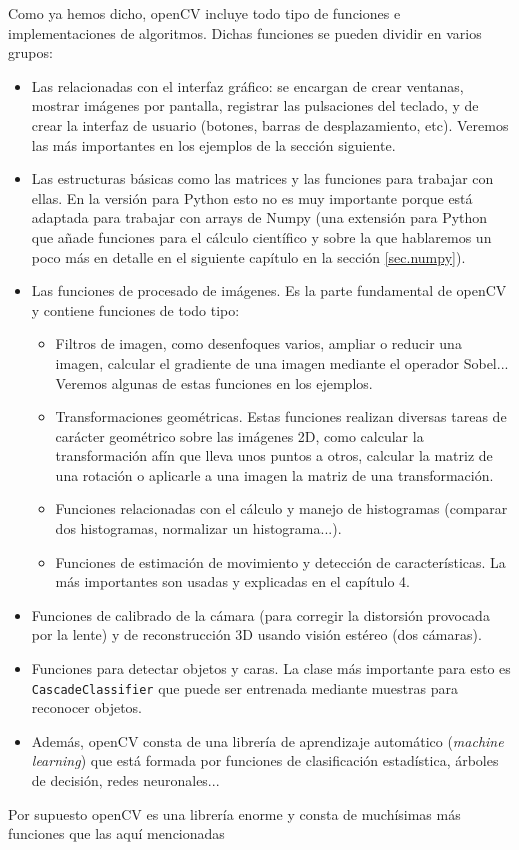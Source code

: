 \documentclass[a4paper,openright, 12pt]{book}
\begin{document}
Como ya hemos dicho, openCV incluye todo tipo de funciones e implementaciones de algoritmos. 
Dichas funciones se pueden dividir en varios grupos:
\begin{itemize}
\item Las relacionadas con el interfaz gráfico: se encargan de crear ventanas, mostrar imágenes por pantalla, registrar las pulsaciones del teclado, y de crear la interfaz de usuario (botones, barras de desplazamiento, etc). Veremos las más importantes en los ejemplos de la sección siguiente.
\item Las estructuras básicas como las matrices y las funciones para trabajar con ellas. En la versión para Python esto no es muy importante porque está adaptada para trabajar con arrays de Numpy\cite{numpyrefman} (una extensión para Python que añade funciones para el cálculo científico y sobre la que hablaremos un poco más en detalle en el siguiente capítulo en la sección \ref{sec.numpy}).
\item Las funciones de procesado de imágenes. Es la parte fundamental de openCV y contiene funciones de todo tipo: 
\begin{itemize}
\item Filtros de imagen, como desenfoques varios, ampliar o reducir una imagen, calcular el gradiente de una imagen mediante el operador Sobel...
\newline Veremos algunas de estas funciones en los ejemplos.
\item Transformaciones geométricas. Estas funciones realizan diversas tareas de carácter geométrico sobre las imágenes 2D, como calcular la transformación afín que lleva unos puntos a otros, calcular la matriz de una rotación o aplicarle a una imagen la matriz de una transformación.
\item Funciones relacionadas con el cálculo y manejo de histogramas (comparar dos histogramas, normalizar un histograma...).
\item Funciones de estimación de movimiento y detección de características. La más importantes son usadas y explicadas en el capítulo 4.
\end{itemize}
\item Funciones de calibrado de la cámara (para corregir la distorsión provocada por la lente) y de reconstrucción 3D usando visión estéreo (dos cámaras).
\item Funciones para detectar objetos y caras. La clase más importante para esto es \lstinline|CascadeClassifier| que puede ser entrenada mediante muestras para reconocer objetos.
\item Además, openCV consta de una librería de aprendizaje automático (\textit{machine learning}) que está formada por funciones de clasificación estadística, árboles de decisión, redes neuronales...
\end{itemize}
Por supuesto openCV es una librería enorme y consta de muchísimas más funciones que las aquí mencionadas\newpage
\end{document}
